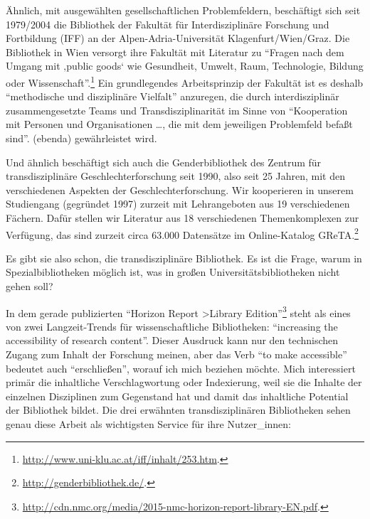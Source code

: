 Ähnlich, mit ausgewählten gesellschaftlichen Problemfeldern, beschäftigt
sich seit 1979/2004 die Bibliothek der Fakultät für Interdisziplinäre
Forschung und Fortbildung (IFF) an der Alpen-Adria-Universität
Klagenfurt/Wien/Graz. Die Bibliothek in Wien versorgt ihre Fakultät mit
Literatur zu \enquote{Fragen nach dem Umgang mit ‚public goods` wie
Gesundheit, Umwelt, Raum, Technologie, Bildung oder
Wissenschaft}.\footnote{\url{http://www.uni-klu.ac.at/iff/inhalt/253.htm}.}
Ein grundlegendes Arbeitsprinzip der Fakultät ist es deshalb
\enquote{methodische und disziplinäre Vielfalt} anzuregen, die durch
interdisziplinär zusammengesetzte Teams und Transdisziplinarität im
Sinne von \enquote{Kooperation mit Personen und Organisationen \ldots{},
die mit dem jeweiligen Problemfeld befaßt sind}. (ebenda) gewährleistet
wird.

Und ähnlich beschäftigt sich auch die Genderbibliothek des Zentrum für
transdisziplinäre Geschlechterforschung seit 1990, also seit 25 Jahren,
mit den verschiedenen Aspekten der Geschlechterforschung. Wir
kooperieren in unserem Studiengang (gegründet 1997) zurzeit mit
Lehrangeboten aus 19 verschiedenen Fächern. Dafür stellen wir Literatur
aus 18 verschiedenen Themenkomplexen zur Verfügung, das sind zurzeit
circa 63.000 Datensätze im Online-Katalog GReTA.\footnote{\url{http://genderbibliothek.de/}.}

Es gibt sie also schon, die transdisziplinäre Bibliothek. Es ist die
Frage, warum in Spezialbibliotheken möglich ist, was in großen
Universitätsbibliotheken nicht gehen soll?

In dem gerade publizierten \enquote{Horizon Report \textgreater{}Library
Edition}\footnote{\url{http://cdn.nmc.org/media/2015-nmc-horizon-report-library-EN.pdf}.}
steht als eines von zwei Langzeit-Trends für wissenschaftliche
Bibliotheken: \enquote{increasing the accessibility of research
content}. Dieser Ausdruck kann nur den technischen Zugang zum Inhalt der
Forschung meinen, aber das Verb \enquote{to make accessible} bedeutet
auch \enquote{erschließen}, worauf ich mich beziehen möchte. Mich
interessiert primär die inhaltliche Verschlagwortung oder Indexierung,
weil sie die Inhalte der einzelnen Disziplinen zum Gegenstand hat und
damit das inhaltliche Potential der Bibliothek bildet. Die drei
erwähnten transdisziplinären Bibliotheken sehen genau diese Arbeit als
wichtigsten Service für ihre Nutzer\_innen:

